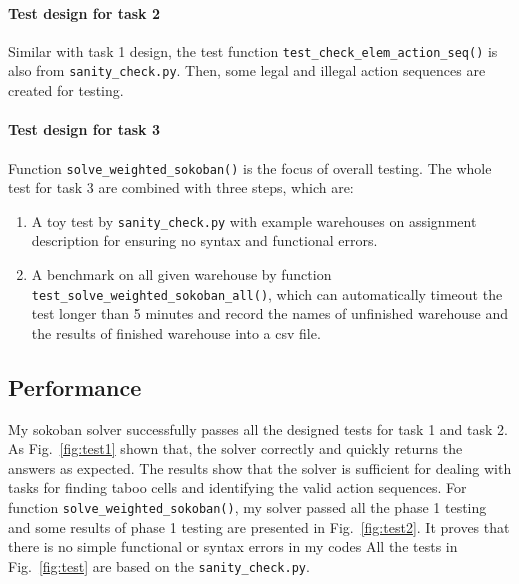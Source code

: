 \documentclass{article}
\begin{document}
\paragraph{Test design for task 2} 
Similar with task 1 design, the test function \texttt{test\_check\_elem\_action\_seq()} is also from \texttt{sanity\_check.py}. Then, some legal and illegal action sequences are created for testing.

\paragraph{Test design for task 3} 
Function \texttt{solve\_weighted\_sokoban()} is the focus of overall testing. The whole test for task 3 are combined with three steps, which are:

\begin{enumerate}
    \item A toy test by \texttt{sanity\_check.py} with example warehouses on assignment description for ensuring no syntax and functional errors.
    \item A benchmark on all given warehouse by function \texttt{test\_solve\_weighted\_sokoban\_all()}, which can automatically timeout the test longer than 5 minutes and record the names of unfinished warehouse and the results of finished warehouse into a csv file.
\end{enumerate}

\subsection{Performance}

My sokoban solver successfully passes all the designed tests for task 1 and task 2. As Fig.~\ref{fig:test1} shown that, the solver correctly and quickly returns the answers as expected. The results show that the solver is sufficient for dealing with tasks for finding taboo cells and identifying the valid action sequences. For function \texttt{solve\_weighted\_sokoban()}, my solver passed all the phase 1 testing and some results of phase 1 testing are presented in Fig.~\ref{fig:test2}. It proves that there is no simple functional or syntax errors in my codes All the tests in Fig.~\ref{fig:test} are based on the \texttt{sanity\_check.py}.
\end{document}
